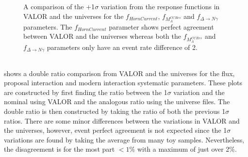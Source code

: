 \begin{figure}[h!]
  \captionsetup{width=0.49\textwidth}
  \parbox[b]{0.49\textwidth}%
  {
   \caption[+1$\sigma$ variation comparison for the $f_{HornCurrent}$, $f_{M_A^{CCRes}}$ and $f_{\Delta \rightarrow N \gamma}$ parameters.]{A comparison of the +1$\sigma$ variation from the response functions in VALOR and the universes for the $f_{HornCurrent}$, $f_{M_A^{CCRes}}$ and $f_{\Delta \rightarrow N \gamma}$ parameters. The $f_{HornCurrent}$ parameter shows perfect agreement between VALOR and the universes whereas both the $f_{M_A^{CCRes}}$ and $f_{\Delta \rightarrow N \gamma}$ parameters only have an event rate difference of 2. \\\phantom{.}\\
   \label{fig:+1sigma_variations}}
   }
\end{figure}

 shows a double ratio comparison from VALOR and the universes for the flux, proposal interaction and modern interaction systematic parameters. These plots are constructed by first finding the ratio between the 1$\sigma$ variation and the nominal using VALOR and the analogous ratio using the universe files. The double ratio is then constructed by taking the ratio of both the previous 1$\sigma$ ratios. There are some minor differences between the variations in VALOR and the universes, however, event perfect agreement is not expected since the 1$\sigma$ variations are found by taking the average from many toy samples. Nevertheless, the disagreement is for the most part $< 1\%$ with a maximum of just over 2\%. 



